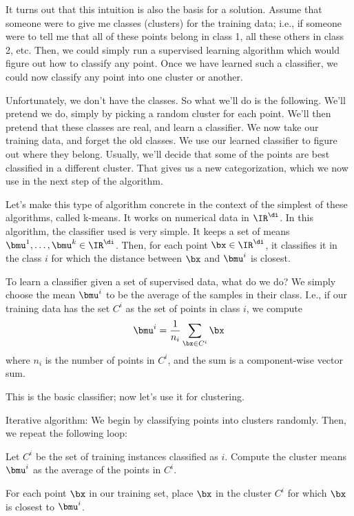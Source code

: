It turns out that this intuition is also the basis for a solution.
Assume that someone were to give me classes (clusters) for the
training data; i.e., if someone were to tell me that all of these
points belong in class 1, all these others in class 2, etc.  Then, we
could simply run a supervised learning algorithm which would figure
out how to classify any point.  Once we have learned such a
classifier, we could now classify any point into one cluster or
another.  

Unfortunately, we don't have the classes.  So what we'll do is the
following.  We'll pretend we do, simply by picking a random cluster
for each point.  We'll then pretend that these classes are real, and
learn a classifier.  We now take our training data, and forget the
old classes.  We use our learned classifier to figure out where they
belong.  Usually, we'll decide that some of the points are best
classified in a different cluster.  That gives us a new
categorization, which we now use in the next step of the algorithm.

Let's make this type of algorithm concrete in the context of the
simplest of these algorithms, called k-means.  It works on numerical
data in $\IR^\di$.  In this algorithm, the classifier used is very
simple.  It keeps a set of means $\bmu^1,\ldots,\bmu^k \in \IR^\di$.
Then, for each point $\bx \in \IR^\di$, it classifies it in the class
$i$ for which the distance between $\bx$ and $\bmu^i$ is closest.

To learn a classifier given a set of supervised data, what do we do?
We simply choose the mean $\bmu^i$ to be the average of the samples in
their class.  I.e., if our training data has the set $C^i$ as the set
of points in class $i$, we compute 
\[
  \bmu^i = \frac{1}{n_i} \sum_{\bx \in C^i} \bx
\]
where $n_i$ is the number of points in $C^i$, and the sum is a
component-wise vector sum.

This is the basic classifier; now let's use it for clustering.

Iterative algorithm:  We begin by classifying points into clusters randomly.
Then, we repeat the following loop: 
\bitem
\item
Let $C^i$ be the set of training instances classified as $i$.  Compute
the cluster means $\bmu^i$ as the average of the points in $C^i$.
\item
For each point $\bx$ in our training set, place $\bx$ in the cluster
$C^i$ for which $\bx$ is closest to $\bmu^i$.
\eitem


